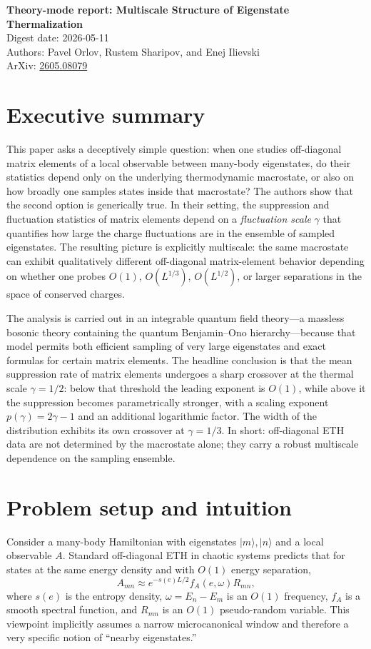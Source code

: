 \documentclass[11pt]{article}
\begin{document}
\begin{center}
{\Large \textbf{Theory-mode report: Multiscale Structure of Eigenstate Thermalization}}\\[0.4em]
Digest date: 2026-05-11\\
Authors: Pavel Orlov, Rustem Sharipov, and Enej Ilievski\\
ArXiv: \href{https://arxiv.org/abs/2605.08079}{2605.08079}
\end{center}

\section*{Executive summary}
This paper asks a deceptively simple question: when one studies off-diagonal matrix elements of a local observable between many-body eigenstates, do their statistics depend only on the underlying thermodynamic macrostate, or also on how broadly one samples states inside that macrostate? The authors show that the second option is generically true. In their setting, the suppression and fluctuation statistics of matrix elements depend on a \emph{fluctuation scale} $\gamma$ that quantifies how large the charge fluctuations are in the ensemble of sampled eigenstates. The resulting picture is explicitly multiscale: the same macrostate can exhibit qualitatively different off-diagonal matrix-element behavior depending on whether one probes $O(1)$, $O(L^{1/3})$, $O(L^{1/2})$, or larger separations in the space of conserved charges.

The analysis is carried out in an integrable quantum field theory---a massless bosonic theory containing the quantum Benjamin--Ono hierarchy---because that model permits both efficient sampling of very large eigenstates and exact formulas for certain matrix elements. The headline conclusion is that the mean suppression rate of matrix elements undergoes a sharp crossover at the thermal scale $\gamma=1/2$: below that threshold the leading exponent is $O(1)$, while above it the suppression becomes parametrically stronger, with a scaling exponent $p(\gamma)=2\gamma-1$ and an additional logarithmic factor. The width of the distribution exhibits its own crossover at $\gamma=1/3$. In short: off-diagonal ETH data are not determined by the macrostate alone; they carry a robust multiscale dependence on the sampling ensemble.

\section*{Problem setup and intuition}
Consider a many-body Hamiltonian with eigenstates $|m\rangle,|n\rangle$ and a local observable $A$. Standard off-diagonal ETH in chaotic systems predicts that for states at the same energy density and with $O(1)$ energy separation,
\[
A_{mn} \approx e^{-s(e)L/2} f_A(e,\omega) R_{mn},
\]
where $s(e)$ is the entropy density, $\omega=E_n-E_m$ is an $O(1)$ frequency, $f_A$ is a smooth spectral function, and $R_{mn}$ is an $O(1)$ pseudo-random variable. This viewpoint implicitly assumes a narrow microcanonical window and therefore a very specific notion of ``nearby eigenstates.''
\end{document}

